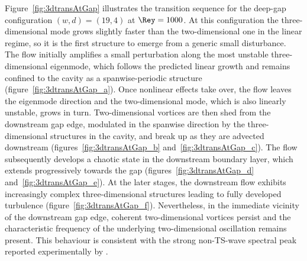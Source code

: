 \documentclass[lineno]{jfm}
\begin{document}
Figure~\ref{fig:3dtransAtGap} illustrates the transition sequence for the deep-gap configuration $(w,d)=(19,4)$ at $\Rey=1000$. At this configuration the three-dimensional mode grows slightly faster than the two-dimensional one in the linear regime, so it is the first structure to emerge from a generic small disturbance. The flow initially amplifies a small perturbation along the most unstable three-dimensional eigenmode, which follows the predicted linear growth and remains confined to the cavity as a spanwise-periodic structure (figure~\ref{fig:3dtransAtGap_a}). Once nonlinear effects take over, the flow leaves the eigenmode direction and the two-dimensional mode, which is also linearly unstable, grows in turn. Two-dimensional vortices are then shed from the downstream gap edge, modulated in the spanwise direction by the three-dimensional structures in the cavity, and break up as they are advected downstream (figures~\ref{fig:3dtransAtGap_b} and~\ref{fig:3dtransAtGap_c}). The flow subsequently develops a chaotic state in the downstream boundary layer, which extends progressively towards the gap (figures~\ref{fig:3dtransAtGap_d} and~\ref{fig:3dtransAtGap_e}). At the later stages, the downstream flow exhibits increasingly complex three-dimensional structures leading to fully developed turbulence (figure~\ref{fig:3dtransAtGap_f}). Nevertheless, in the immediate vicinity of the downstream gap edge, coherent two-dimensional vortices persist and the characteristic frequency of the underlying two-dimensional oscillation remains present. This behaviour is consistent with the strong non-\ac{TS}-wave spectral peak reported experimentally by \citet{jeffGaps}.
\end{document}
